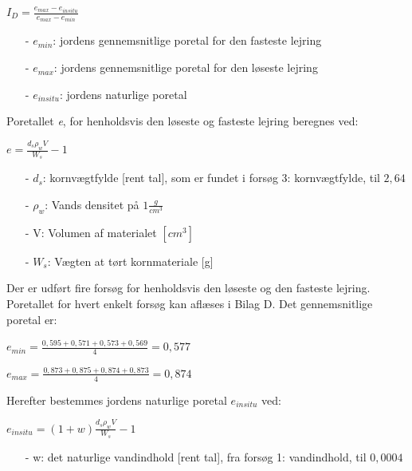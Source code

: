 \begin{center}
	$I_D = \frac{e_{max} - e_{in situ}}{e_{max} - e_{min}}$
\end{center}

\begin{itemize}
	\item[-] $e_{min}$: jordens gennemsnitlige poretal for den fasteste lejring 
	\item[-] $e_{max}$: jordens gennemsnitlige poretal for den løseste lejring
	\item[-] $e_{in situ}$: jordens naturlige poretal 
\end{itemize}

Poretallet \textit{e}, for henholdsvis den løseste og fasteste lejring beregnes ved:

\begin{center}
	$e = \frac{d_s \rho_w  V}{W_s} - 1$
\end{center}

\begin{itemize}
	\item[-] $d_s$: kornvægtfylde [rent tal], som er fundet i forsøg 3: kornvægtfylde, til $2,\!64$ 
	\item[-] $\rho_w$: Vands densitet på $1 \frac{g}{cm^3}$
	\item[-] V: Volumen af materialet $[cm^3]$
	\item[-] $W_s$: Vægten at tørt kornmateriale [g]
\end{itemize}
 
Der er udført fire forsøg for henholdsvis den løseste og den fasteste lejring. Poretallet for hvert enkelt forsøg kan aflæses i Bilag D.
Det gennemsnitlige poretal er:

\begin{center}
	$e_{min} = \frac{0,\!595 + 0,\!571 + 0,\!573 + 0,\!569}{4} = 0,\!577$
\end{center}

\begin{center}
	$e_{max} = \frac{0,\!873 + 0,\!875 + 0,\!874 + 0,\!873}{4} = 0,\!874$
\end{center}

Herefter bestemmes jordens naturlige poretal $e_{in situ}$ ved:

\begin{center}
	$e_{in situ} = (1 + w) \frac{d_s  \rho_w  V}{W_s} - 1$
\end{center}

\begin{itemize}
	\item[-] w: det naturlige vandindhold [rent tal], fra forsøg 1: vandindhold, til $0,\!0004$ 
\end{itemize}

